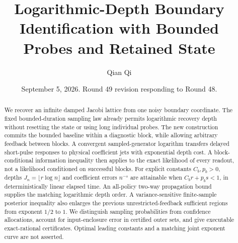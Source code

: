 \documentclass[11pt,reqno]{amsart}
\title[Bounded probes and logarithmic depth]{Logarithmic-Depth Boundary Identification with Bounded Probes and Retained State}
\author{Qian Qi}
\date{September 5, 2026. Round 49 revision responding to Round 48.}
\theoremstyle{definition}\newtheorem{definition}[theorem]{Definition}
\theoremstyle{remark}\newtheorem{remark}[theorem]{Remark}
\begin{document}
\begin{abstract}
We recover an infinite damped Jacobi lattice from one noisy boundary coordinate.
The fixed bounded-duration sampling law already permits logarithmic recovery
depth without resetting the state or using long individual probes. The new
construction commits the bounded baseline within a diagnostic block, while
allowing arbitrary feedback between blocks. A convergent sampled-generator
logarithm transfers delayed short-pulse responses to physical coefficient
jets with exponential depth cost. A block-conditional information inequality
then applies to the exact likelihood of every readout, not a likelihood
conditioned on successful blocks. For explicit constants $C_b,p_b>0$, depths
$J_n=\lfloor r\log n\rfloor$ and coefficient errors $n^{-s}$ are attainable
when $C_b r+p_b s<1$, in deterministically linear elapsed time. An all-policy
two-way propagation bound supplies the matching logarithmic depth order.
A variance-sensitive finite-sample posterior inequality also enlarges the
previous unrestricted-feedback sufficient regions from exponent $1/2$ to $1$.
We distinguish sampling probabilities from confidence allocations, account for
input-enclosure error in certified outer sets, and give executable exact-rational
certificates. Optimal leading constants and a matching joint exponent curve
are not asserted.
\end{abstract}
\maketitle\tableofcontents











\end{document}
